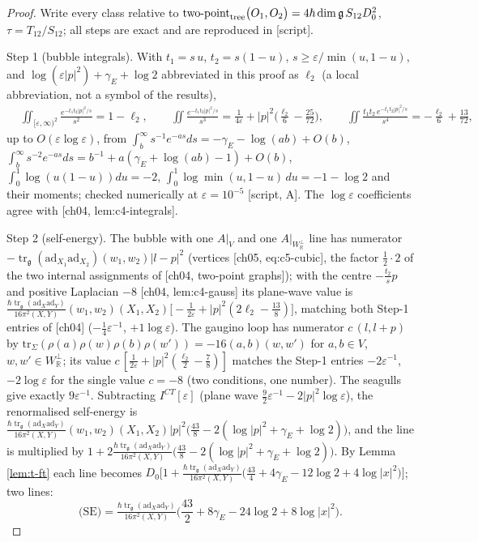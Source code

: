 \documentclass[11pt]{report}
\theoremstyle{plain}
\theoremstyle{definition}
\numberwithin{equation}{chapter}
\newcommand{\unit}{\tfrac{\hbar\operatorname{tr}_{\mathfrak g}(\mathrm{ad}_X\mathrm{ad}_Y)}{16\pi^2(X,Y)}}
\newcommand{\Wp}{W_{\mathbb R}^\perp}
\newcommand{\TPz}[2]{\mathrm{two\mbox{-}point}_{\rm tree}\big(#1,#2\big)}
\begin{document}
\begin{proof}
Write every class relative to $\TPz{O_1}{O_2}=4\hbar\dim\mathfrak g\,S_{12}D_0^2$, $\tau=T_{12}/S_{12}$; all steps are exact and are reproduced in [script].

Step 1 (bubble integrals). With $t_1=s\,u$, $t_2=s(1-u)$, $s\ge\varepsilon/\min(u,1-u)$, and $\log(\varepsilon|p|^2)+\gamma_E+\log2$ abbreviated in this proof as $\ell_2$ (a local abbreviation, not a symbol of the results),
\[
\begin{aligned}
&\iint_{[\varepsilon,\infty)^2}\frac{e^{-t_1t_2|p|^2/s}}{s^2}=1-\ell_2,\qquad \iint\frac{e^{-t_1t_2|p|^2/s}}{s^3}=\frac1{4\varepsilon}+|p|^2\Big(\frac{\ell_2}6-\frac{25}{72}\Big),\qquad \iint\frac{t_1t_2\,e^{-t_1t_2|p|^2/s}}{s^4}=-\frac{\ell_2}6+\frac{13}{72},
\end{aligned}
\]
up to $O(\varepsilon\log\varepsilon)$, from $\int_b^\infty s^{-1}e^{-as}ds=-\gamma_E-\log(ab)+O(b)$, $\int_b^\infty s^{-2}e^{-as}ds=b^{-1}+a(\gamma_E+\log(ab)-1)+O(b)$, $\int_0^1\log(u(1-u))du=-2$, $\int_0^1\log\min(u,1-u)\,du=-1-\log2$ and their moments; checked numerically at $\varepsilon=10^{-5}$ [script, A]. The $\log\varepsilon$ coefficients agree with [ch04, lem:c4-integrals].

Step 2 (self-energy). The bubble with one $A|_V$ and one $A|_{\Wp}$ line has numerator $-\operatorname{tr}_{\mathfrak g}(\mathrm{ad}_{X_1}\mathrm{ad}_{X_2})(w_1,w_2)|l-p|^2$ (vertices [ch05, eq:c5-cubic], the factor $\tfrac12\cdot2$ of the two internal assignments of [ch04, two-point graphs]); with the centre $-\tfrac{t_2}sp$ and positive Laplacian $-8$ [ch04, lem:c4-gauss] its plane-wave value is $\unit(w_1,w_2)(X_1,X_2)\big[-\tfrac1{2\varepsilon}+|p|^2(2\ell_2-\tfrac{13}8)\big]$, matching both Step-1 entries of [ch04] ($-\tfrac14\varepsilon^{-1}$, $+1\log\varepsilon$). The gaugino loop has numerator $c\,(l,l+p)$ by $\mathrm{tr}_\Sigma(\rho(a)\rho(w)\rho(b)\rho(w'))=-16(a,b)(w,w')$ for $a,b\in V$, $w,w'\in\Wp$; its value $c\,[\tfrac1{2\varepsilon}+|p|^2(\tfrac{\ell_2}2-\tfrac78)]$ matches the Step-1 entries $-2\varepsilon^{-1}$, $-2\log\varepsilon$ for the single value $c=-8$ (two conditions, one number). The seagulls give exactly $9\varepsilon^{-1}$. Subtracting $I^{CT}[\varepsilon]$ (plane wave $\tfrac92\varepsilon^{-1}-2|p|^2\log\varepsilon$), the renormalised self-energy is $\unit(w_1,w_2)(X_1,X_2)|p|^2\big(\tfrac{43}8-2(\log|p|^2+\gamma_E+\log2)\big)$, and the line is multiplied by $1+2\unit\big(\tfrac{43}8-2(\log|p|^2+\gamma_E+\log2)\big)$. By Lemma \ref{lem:t-ft} each line becomes $D_0\big[1+\unit\big(\tfrac{43}4+4\gamma_E-12\log2+4\log|x|^2\big)\big]$; two lines:
\[
\text{(SE)}=\unit\Big(\frac{43}2+8\gamma_E-24\log2+8\log|x|^2\Big).
\]


\end{proof}
\end{document}
